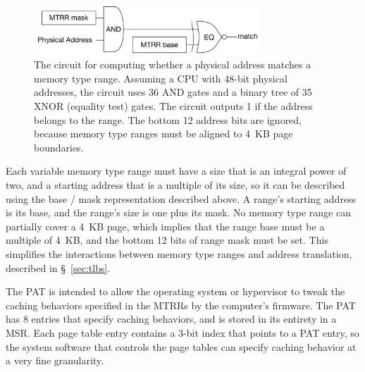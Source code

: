 \begin{figure}[hbt]
  \centering
  \includegraphics[width=85mm]{figures/mtrr_match.pdf}
  \caption{
    The circuit for computing whether a physical address matches a memory type
    range.  Assuming a CPU with 48-bit physical addresses, the circuit uses 36
    AND gates and a binary tree of 35 XNOR (equality test) gates. The circuit
    outputs 1 if the address belongs to the range. The bottom 12 address
    bits are ignored, because memory type ranges must be aligned to 4~KB page
    boundaries.
  }
  \label{fig:mtrr_match}
\end{figure}

Each variable memory type range must have a size that is an integral power of
two, and a starting address that is a multiple of its size, so it can be
described using the base / mask representation described above. A range's
starting address is its base, and the range's size is one plus its mask. No
memory type range can partially cover a 4~KB page, which implies that the range
base must be a multiple of 4~KB, and the bottom 12 bits of range mask must be
set. This simplifies the interactions between memory type ranges and address
translation, described in \S~\ref{sec:tlbs}.

The PAT is intended to allow the operating system or hypervisor to tweak the
caching behaviors specified in the MTRRs by the computer's firmware. The PAT
has 8 entries that specify caching behaviors, and is stored in its entirety in
a MSR. Each page table entry contains a 3-bit index that points to a PAT entry,
so the system software that controls the page tables can specify caching
behavior at a very fine granularity.
